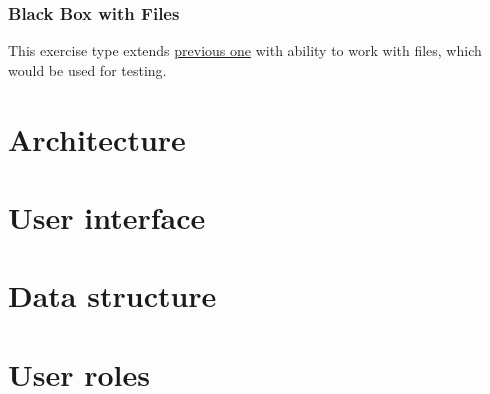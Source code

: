         
        \subsubsection{Black Box with Files}
        This exercise type extends \hyperref[subsubsec:blackbox]{previous one} with ability to work with files, which would be used for testing.


\section{Architecture}

\section{User interface}

\section{Data structure}

\section{User roles}
